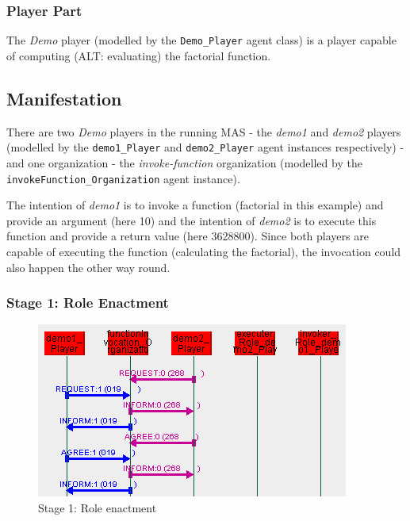 \subsubsection*{Player Part}

The \textit{Demo} player (modelled by the \texttt{Demo\_Player} agent class) is a player capable of computing (ALT: evaluating) the factorial function.

\subsection*{Manifestation}

There are two \textit{Demo} players in the running MAS - the \textit{demo1} and \textit{demo2} players (modelled by the \texttt{demo1\_Player} and \texttt{demo2\_Player} agent instances respectively) - and one organization - the \textit{invoke-function} organization (modelled by the \texttt{invokeFunction\_Organization} agent instance).

The intention of \textit{demo1} is to invoke a function (factorial in this example) and provide an argument (here 10) and the intention of \textit{demo2} is to execute this function and provide a return value (here 3628800).
Since both players are capable of executing the function (calculating the factorial), the invocation could also happen the other way round.

\subsubsection*{Stage 1: Role Enactment}

\begin{figure}[H]
	\centering
	\includegraphics[width=\textwidth]{images/example1-stage1.png}
	\caption{Stage 1: Role enactment}
	\label{figure:example1-stage1}
\end{figure}


